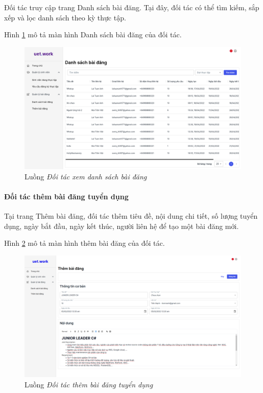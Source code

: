 \documentclass[./../main.tex]{subfiles}
\begin{document}
Đối tác truy cập trang Danh sách bài đăng. Tại đây, đối tác có thể tìm kiếm, sắp xếp và lọc danh sách theo kỳ thực tập.

Hình \ref{fig:partner_list_post_page} mô tả màn hình Danh sách bài đăng của đối tác.

\begin{figure}[]
	\includegraphics[width=\linewidth]{./images/list_post.png}
	\caption{Luồng \emph{Đối tác xem danh sách bài đăng}}
	\label{fig:partner_list_post_page}
\end{figure}

\paragraph*{Đối tác thêm bài đăng tuyển dụng}

Tại trang Thêm bài đăng, đối tác thêm tiêu đề, nội dung chi tiết, số lượng tuyển dụng, ngày bắt đầu, ngày kết thúc, người liên hệ để tạo một bài đăng mới.

Hình \ref{fig:add_post_page} mô tả màn hình thêm bài đăng của đối tác.

\begin{figure}[]
	\includegraphics[width=\linewidth]{./images/image18.png}
	\caption{Luồng \emph{Đối tác thêm bài đăng tuyển dụng}}
	\label{fig:add_post_page}
\end{figure}
\end{document}
